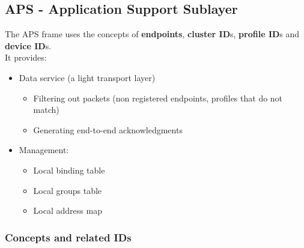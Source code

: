 \subsection{APS - Application Support Sublayer}
The APS frame uses the concepts of \textbf{endpoints}, \textbf{cluster
ID}s, \textbf{profile ID}s and \textbf{device ID}s.\\
It provides:
\begin{itemize}
   \item Data service (a light transport layer)
   \begin{itemize}
      \item Filtering out packets (non registered endpoints, profiles that do
      not match)
      \item Generating end-to-end acknowledgments
   \end{itemize}
   \item Management:
   \begin{itemize}
      \item Local binding table
      \item Local groups table
      \item Local address map
   \end{itemize}
\end{itemize}

\subsubsection{Concepts and related IDs}

